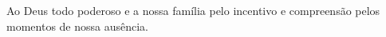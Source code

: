 \begin{dedicatoria}
   \vspace*{\fill}
   \noindent\hfill
   \begin{minipage}{0.5\textwidth}
       \normalfont\normalsize\SingleSpacing
       Ao Deus todo poderoso e a nossa família pelo incentivo e compreensão pelos momentos de nossa ausência.
   \end{minipage}
\end{dedicatoria}
